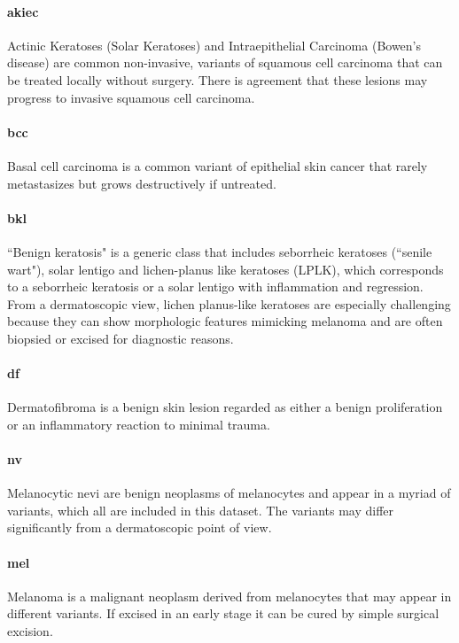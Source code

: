 	\paragraph{akiec}
	Actinic Keratoses (Solar Keratoses) and Intraepithelial Carcinoma (Bowen's disease) are common non-invasive, variants of squamous cell carcinoma that can be treated locally without surgery. There is agreement that these lesions may progress to invasive squamous cell carcinoma. 
	
	\paragraph{bcc}
	Basal cell carcinoma is a common variant of epithelial skin cancer that rarely metastasizes but grows destructively if untreated. 
	
	\paragraph{bkl}
	``Benign keratosis" is a generic class that includes seborrheic keratoses (``senile wart"), solar lentigo and lichen-planus like keratoses (LPLK), which corresponds to a seborrheic keratosis or a solar lentigo with inflammation and regression. From a dermatoscopic view, lichen planus-like keratoses are especially challenging because they can show morphologic features mimicking melanoma and are often biopsied or excised for diagnostic reasons. 
	
	\paragraph{df}
	Dermatofibroma is a benign skin lesion regarded as either a benign proliferation or an inflammatory reaction to minimal trauma. 
	
	\paragraph{nv}
	Melanocytic nevi are benign neoplasms of melanocytes and appear in a myriad of variants, which all are included in this dataset. The variants may differ significantly from a dermatoscopic point of view.
	
	\paragraph{mel}
	Melanoma is a malignant neoplasm derived from melanocytes that may appear in different variants. If excised in an early stage it can be cured by simple surgical excision. 
	

